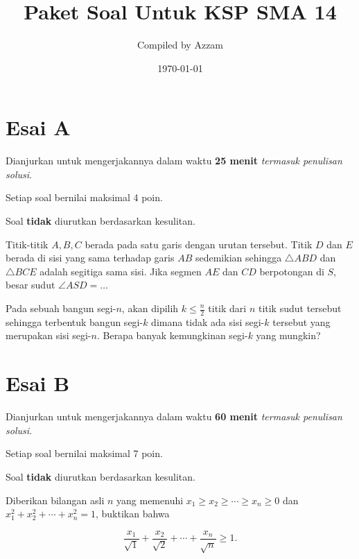 \documentclass[11pt]{scrartcl}
\begin{document}
	\title{Paket Soal Untuk KSP SMA 14} %
	\date{\today}
	\author{Compiled by Azzam}
	\maketitle
	

	\section{Esai A}
	Dianjurkan untuk mengerjakannya dalam waktu \textbf{25 menit} \textit{termasuk penulisan solusi}.
	
	Setiap soal bernilai maksimal 4 poin.
	
	Soal \textbf{tidak} diurutkan berdasarkan kesulitan. 
	
	\begin{soalbaru}
	Titik-titik $A,B,C$ berada pada satu garis dengan urutan tersebut. Titik $D$ dan $E$ berada di sisi yang sama terhadap garis $AB$ sedemikian sehingga $\triangle ABD$ dan $\triangle BCE$ adalah segitiga sama sisi. Jika segmen $AE$ dan $CD$ berpotongan di $S$, besar sudut $\angle ASD = \dots$
	\end{soalbaru}
	
	\begin{soalbaru}
	Pada sebuah bangun segi-$n$, akan dipilih $k \le \frac{n}{2}$ titik dari $n$ titik sudut tersebut sehingga terbentuk bangun segi-$k$ dimana tidak ada sisi segi-$k$ tersebut yang merupakan sisi segi-$n$. Berapa banyak kemungkinan segi-$k$ yang mungkin?
	\end{soalbaru}
	
	\section{Esai B}
	Dianjurkan untuk mengerjakannya dalam waktu \textbf{60 menit} \textit{termasuk penulisan solusi}.
	
	Setiap soal bernilai maksimal 7 poin.
		
	Soal \textbf{tidak} diurutkan berdasarkan kesulitan.
	
	\begin{soalbaru}
		Diberikan bilangan asli $n$ yang memenuhi $x_1 \ge x_2 \ge \cdots \ge x_n \ge 0$ dan $x_1^2+x_2^2+\cdots+x_n^2=1$, 
		buktikan bahwa
		
		$$\dfrac{x_1}{\sqrt{1}}+\dfrac{x_2}{\sqrt{2}}+\cdots+\dfrac{x_n}{\sqrt{n}}\ge 1.$$
	\end{soalbaru} 
	
\end{document}
